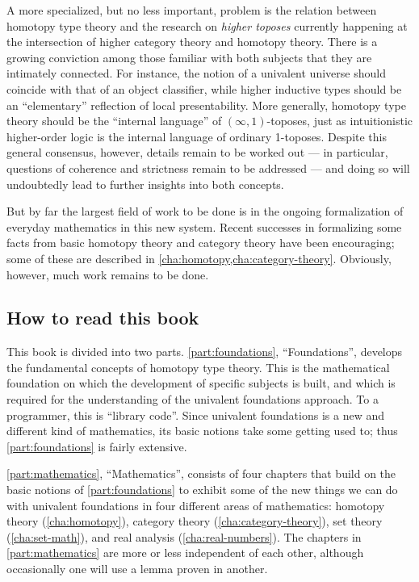 A more specialized, but no less important, problem is the relation between homotopy type theory and the research  on \emph{higher toposes} currently happening at the intersection of higher category theory and homotopy theory.
There is a growing conviction among those familiar with both subjects that they are intimately connected.
For instance, the notion of a univalent universe should coincide with that of an object classifier, while higher inductive types should be an ``elementary'' reflection of local presentability.
More generally, homotopy type theory should be the ``internal language'' of $(\infty,1)$-toposes, just as intuitionistic higher-order logic is the internal language of ordinary 1-toposes.
Despite this general consensus, however, details remain to be worked out --- in particular, questions of coherence and strictness remain to be addressed  --- and doing so will undoubtedly lead to further insights into both concepts.

But by far the largest field of work to be done is in the ongoing formalization of everyday mathematics in this new system.
Recent successes in formalizing some facts from basic homotopy theory and category theory have been encouraging; some of these are described in \cref{cha:homotopy,cha:category-theory}.
Obviously, however, much work remains to be done.


\subsection*{How to read this book}

This book is divided into two parts.
\autoref{part:foundations}, ``Foundations'', develops the fundamental concepts of homotopy type theory.
This is the mathematical foundation on which the development of specific subjects is built, and which is required for the understanding of the univalent foundations approach. To a programmer, this is ``library code''.
Since univalent foundations is a new and different kind of mathematics, its basic notions take some getting used to; thus \autoref{part:foundations} is fairly extensive.

\autoref{part:mathematics}, ``Mathematics'', consists of four chapters that build on the basic notions of \autoref{part:foundations} to exhibit some of the new things we can do with univalent foundations in four different areas of mathematics: homotopy theory (\autoref{cha:homotopy}), category theory (\autoref{cha:category-theory}), set theory (\autoref{cha:set-math}), and real analysis (\autoref{cha:real-numbers}).
The chapters in \autoref{part:mathematics} are more or less independent of each other, although occasionally one will use a lemma proven in another.

